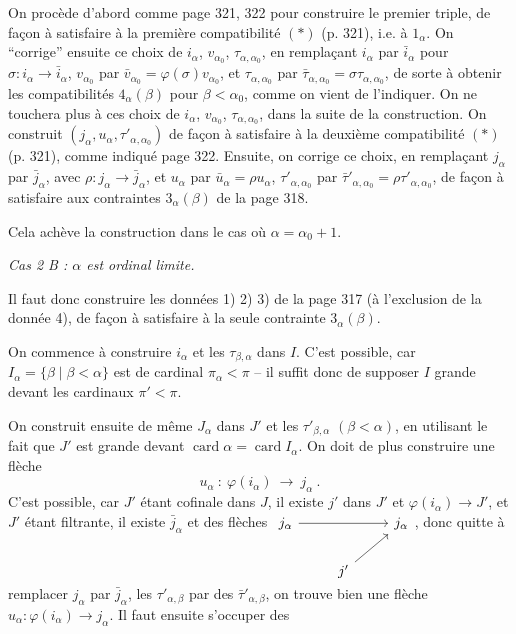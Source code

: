\documentclass[11pt]{article}
\newcommand{\msp}[1]{\marginpar{\footnotesize [#1]}}
\newcommand{\card}{\operatorname{card}}
\begin{document}
On procède d'abord comme page 321, 322 pour construire le premier triple, de façon à satisfaire à la première compatibilité $(*)$ (p. 321), i.e. à $1_\alpha$. On “corrige” ensuite ce choix de $i_\alpha$, $v_{\alpha_0}$, $\tau_{\alpha,\alpha_0}$, en remplaçant $i_\alpha$ par $\bar{i}_\alpha$ pour $\sigma:i_\alpha\longrightarrow\bar{i}_\alpha$, $v_{\alpha_0}$ par $\bar{v}_{\alpha_0}=\varphi(\sigma)v_{\alpha_0}$, et $\tau_{\alpha,\alpha_0}$ par $\bar{\tau}_{\alpha,\alpha_0}=\sigma\tau_{\alpha,\alpha_0}$, de sorte à obtenir les compatibilités $4_\alpha(\beta)$ pour $\beta<\alpha_0$, comme on vient de l'indiquer. On ne touchera plus à ces choix de $i_\alpha$, $v_{\alpha_0}$, $\tau_{\alpha,\alpha_0}$, dans la suite de la construction. On construit $(j_\alpha,u_\alpha,\tau'_{\alpha,\alpha_0})$ de façon à satisfaire à la deuxième compatibilité $(*)$ (p. 321), comme
\msp{page 327}
indiqué page 322. Ensuite, on corrige ce choix, en remplaçant $j_\alpha$ par $\bar{j}_\alpha$, avec $\rho:j_\alpha\longrightarrow\bar{j}_\alpha$, et $u_\alpha$ par $\bar{u}_\alpha=\rho u_\alpha$, $\tau'_{\alpha,\alpha_0}$ par $\bar{\tau}'_{\alpha,\alpha_0}=\rho\tau'_{\alpha,\alpha_0}$, de façon à satisfaire aux contraintes $3_\alpha(\beta)$ de la page 318.

Cela achève la construction dans le cas où $\alpha=\alpha_0+1$.

\textit{Cas 2 B : $\alpha$ est ordinal limite.}

Il faut donc construire les données 1) 2) 3) de la page 317 (à l'exclusion de la donnée 4), de façon à satisfaire à la seule contrainte $3_\alpha(\beta)$.

On commence à construire $i_\alpha$ et les $\tau_{\beta,\alpha}$ dans $I$. C'est possible, car $I_\alpha=\{\beta\mid\beta<\alpha\}$ est de cardinal $\pi_\alpha<\pi$ – il suffit donc de supposer $I$ grande devant les cardinaux $\pi'<\pi$.

On construit ensuite de même $J_\alpha$ dans $J'$ et les $\tau'_{\beta,\alpha}$ $(\beta<\alpha)$, en utilisant le %
\msp{page 328}
fait que $J'$ est grande devant $\card\alpha=\card I_\alpha$. On doit de plus construire une flèche
\[
u_\alpha\ :\ \varphi(i_\alpha)\ \longrightarrow\ j_\alpha\ .
\]
C'est possible, car $J'$ étant cofinale dans $J$, il existe $j'$ dans $J'$ et $\varphi(i_\alpha)\longrightarrow J'$, et $J'$ étant filtrante, il existe $\bar{j}_\alpha$ et des flèches %
$\begin{tikzcd}[ampersand replacement=\&, baseline=(\tikzcdmatrixname-1-1.base)]
j_\alpha \arrow[rr] \& \& j_\alpha \\
\& j' \arrow[ur] \&
\end{tikzcd}$, donc quitte à remplacer $j_\alpha$ par $\bar{j}_\alpha$, les $\tau'_{\alpha,\beta}$ par des $\bar{\tau}'_{\alpha,\beta}$, on trouve bien une flèche $u_\alpha:\varphi(i_\alpha)\longrightarrow j_\alpha$. Il faut ensuite s'occuper des %
\end{document}
